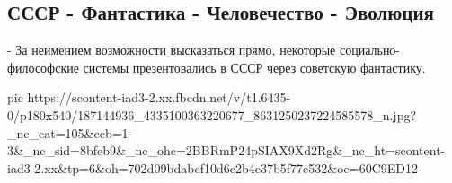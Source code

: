  
 
 
 
 
\subsection{СССР - Фантастика - Человечество - Эволюция}

- За неимением возможности высказаться прямо, некоторые социально-философские
системы презентовались в СССР через советскую фантастику. 

\ifcmt
  pic https://scontent-iad3-2.xx.fbcdn.net/v/t1.6435-0/p180x540/187144936_4335100363220677_8631250237224585578_n.jpg?_nc_cat=105&ccb=1-3&_nc_sid=8bfeb9&_nc_ohc=2BBRmP24pSIAX9Xd2Rg&_nc_ht=scontent-iad3-2.xx&tp=6&oh=702d09bdabcf10d6c2b4e37b5f77e532&oe=60C9ED12
\fi

